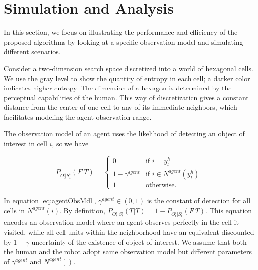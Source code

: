 \section{Simulation and Analysis}
\label{sec:simulation_and_analysis}

In this section, we focus on illustrating the performance and efficiency of the proposed algorithms by looking at a specific observation model and simulating different scenarios.

Consider a two-dimension search space discretized into a world of hexagonal cells.
We use the gray level to show the quantity of entropy in each cell; a darker color indicates higher entropy.
The dimension of a hexagon is determined by the perceptual capabilities of the human.
This way of discretization gives a constant distance from the center of one cell to any of its immediate neighbors, which facilitates modeling the agent observation range.

The observation model of an agent uses the likelihood of detecting an object of interest in cell $ i $, so we have

\begin{equation}
\label{eq:agentObsMdl}
P_{O^{i}_{t}|S^{i}_{t}}(F|T)=
\left\{
\begin{array}{lcl}
    0 & \mbox{if~} i=y^{h}_{t} \\
    1-\gamma^{agent} & \mbox{if~} i \in N^{agent}(y^{h}_{t}) \\
    1 & \mbox{otherwise.}
\end{array}
\right.
\end{equation}

In equation \eqref{eq:agentObsMdl}, $ \gamma^{agent} \in (0,1) $ is the constant of detection for all cells in $ N^{agent}(i) $.
By definition, $ P_{O^{i}_{t}|S^{i}_{t}}(T|T) = 1 - P_{O^{i}_{t}|S^{i}_{t}}(F|T) $.
This equation encodes an observation model where an agent observes perfectly in the cell it visited, while all cell units within the neighborhood have an equivalent discounted by $ 1-\gamma $ uncertainty of the existence of object of interest.
We assume that both the human and the robot adopt same observation model but different parameters of $ \gamma^{agent} $ and $ N^{agent}() $.

